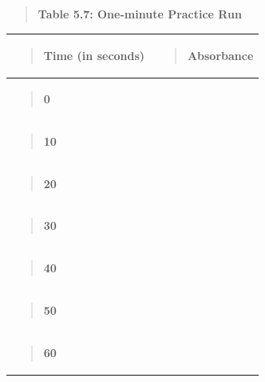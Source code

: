 \documentclass[
  letterpaper,
  DIV=11,
  numbers=noendperiod]{scrreprt}
\newcounter{none} %
\begin{document}
\begin{quote}
\textbf{Table 5.7: One-minute Practice Run}
\end{quote}

{\def\LTcaptype{none} %
\begin{longtable}[]{@{}
  >{\raggedright\arraybackslash}p{}
  >{\raggedright\arraybackslash}p{}@{}}
\toprule\noalign{}
\begin{minipage}[b]{\linewidth}\raggedright
\begin{quote}
\textbf{Time (in seconds)}
\end{quote}
\end{minipage} & \begin{minipage}[b]{\linewidth}\raggedright
\begin{quote}
\textbf{Absorbance}
\end{quote}
\end{minipage} \\
\midrule\noalign{}
\endhead
\bottomrule\noalign{}
\endlastfoot
\begin{minipage}[t]{\linewidth}\raggedright
\begin{quote}
\textbf{0}
\end{quote}
\end{minipage} & \\
\begin{minipage}[t]{\linewidth}\raggedright
\begin{quote}
\textbf{10}
\end{quote}
\end{minipage} & \\
\begin{minipage}[t]{\linewidth}\raggedright
\begin{quote}
\textbf{20}
\end{quote}
\end{minipage} & \\
\begin{minipage}[t]{\linewidth}\raggedright
\begin{quote}
\textbf{30}
\end{quote}
\end{minipage} & \\
\begin{minipage}[t]{\linewidth}\raggedright
\begin{quote}
\textbf{40}
\end{quote}
\end{minipage} & \\
\begin{minipage}[t]{\linewidth}\raggedright
\begin{quote}
\textbf{50}
\end{quote}
\end{minipage} & \\
\begin{minipage}[t]{\linewidth}\raggedright
\begin{quote}
\textbf{60}
\end{quote}
\end{minipage} & \\
\end{longtable}
}
\end{document}
